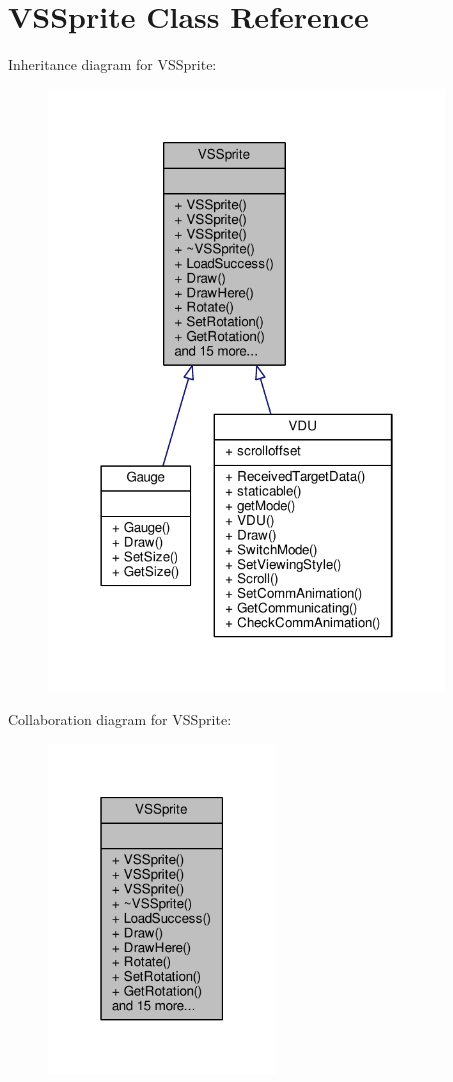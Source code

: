 \hypertarget{classVSSprite}{}\section{V\+S\+Sprite Class Reference}
\label{classVSSprite}


Inheritance diagram for V\+S\+Sprite\+:
\nopagebreak
\begin{figure}[H]
\begin{center}
\leavevmode
\includegraphics[width=298pt]{d6/d77/classVSSprite__inherit__graph}
\end{center}
\end{figure}


Collaboration diagram for V\+S\+Sprite\+:
\nopagebreak
\begin{figure}[H]
\begin{center}
\leavevmode
\includegraphics[width=171pt]{da/d3d/classVSSprite__coll__graph}
\end{center}
\end{figure}
